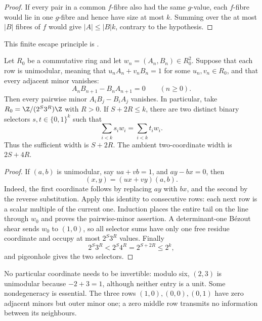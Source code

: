\documentclass[11pt]{article}
\begin{document}
\begin{proof}
If every pair in a common $f$-fibre also had the same $g$-value, each
$f$-fibre would lie in one $g$-fibre and hence have size at most $k$.
Summing over the at most $|B|$ fibres of $f$ would give
$|A|\le |B|k$, contrary to the hypothesis.
\end{proof}

\noindent This finite escape principle is
.

\begin{theorem}
\label{long1049:res:plucker-collapse}
Let $R_0$ be a commutative ring and let $w_n=(A_n,B_n)\in R_0^2$.  Suppose
that each row is unimodular, meaning that $u_nA_n+v_nB_n=1$ for some
$u_n,v_n\in R_0$, and that every adjacent minor vanishes:
\[
 A_nB_{n+1}-B_nA_{n+1}=0\qquad(n\ge0).
\]
Then every pairwise minor $A_iB_j-B_iA_j$ vanishes.  In particular, take
$R_0=\Z/(2^S3^R)\Z$ with $R>0$.  If $S+2R\le k$, there are two distinct
binary selectors $s,t\in\{0,1\}^{k}$ such that
\[
 \sum_{i<k}s_iw_i=\sum_{i<k}t_iw_i.
\]
Thus the sufficient width is $S+2R$.  The ambient two-coordinate width is
$2S+4R$.
\end{theorem}

\begin{proof}
If $(a,b)$ is unimodular, say $ua+vb=1$, and $ay-bx=0$, then
\[
 (x,y)=(ux+vy)(a,b).
\]
Indeed, the first coordinate follows by replacing $ay$ with $bx$, and the
second by the reverse substitution.  Apply this identity to consecutive rows:
each next row is a scalar multiple of the current one.  Induction places the
entire tail on the line through $w_0$ and proves the pairwise-minor assertion.
A determinant-one B\'ezout shear sends $w_0$ to
$(1,0)$, so all selector sums have only one free residue coordinate and occupy
at most $2^S3^R$ values.  Finally
\[
 2^S3^R<2^S4^R=2^{S+2R}\le2^k,
\]
and pigeonhole gives the two selectors.
\end{proof}

\noindent No particular coordinate needs to be invertible: modulo six,
$(2,3)$ is unimodular because $-2+3=1$, although neither entry is a unit.
Some nondegeneracy is essential.  The three rows $(1,0),(0,0),(0,1)$ have
zero adjacent minors but outer minor one; a zero middle row transmits no
information between its neighbours.
\end{document}
